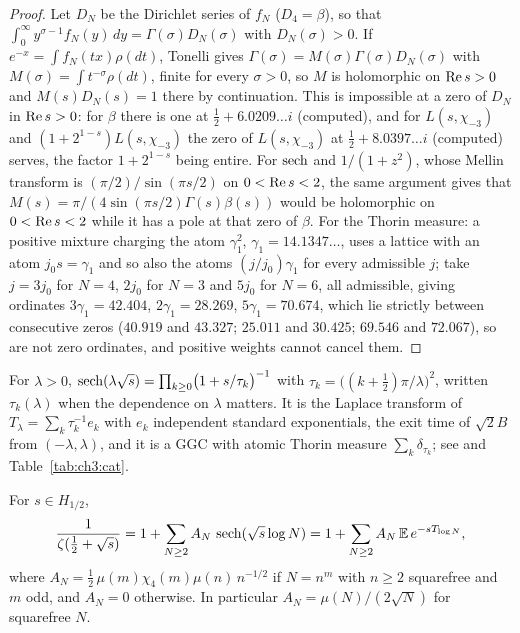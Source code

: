 \begin{proof}
Let $D_N$ be the Dirichlet series of $f_N$ ($D_4=\beta$), so that $\int_0^\infty y^{\sigma-1}f_N(y)\,dy=\Gamma(\sigma)D_N(\sigma)$ with $D_N(\sigma)>0$. If $e^{-x}=\int f_N(tx)\rho(dt)$, Tonelli gives $\Gamma(\sigma)=M(\sigma)\Gamma(\sigma)D_N(\sigma)$ with $M(\sigma)=\int t^{-\sigma}\rho(dt)$, finite for every $\sigma>0$, so $M$ is holomorphic on $\operatorname{Re} s>0$ and $M(s)D_N(s)=1$ there by continuation. This is impossible at a zero of $D_N$ in $\operatorname{Re} s>0$: for $\beta$ there is one at $\frac12+6.0209\ldots i$ (computed), and for $L(s,\chi_{-3})$ and $(1+2^{1-s})L(s,\chi_{-3})$ the zero of $L(s,\chi_{-3})$ at $\frac12+8.0397\ldots i$ (computed) serves, the factor $1+2^{1-s}$ being entire. For $\operatorname{sech}$ and $1/(1+z^2)$, whose Mellin transform is $(\pi/2)/\sin(\pi s/2)$ on $0<\operatorname{Re} s<2$, the same argument gives that $M(s)=\pi/(4\sin(\pi s/2)\Gamma(s)\beta(s))$ would be holomorphic on $0<\operatorname{Re} s<2$ while it has a pole at that zero of $\beta$. For the Thorin measure: a positive mixture charging the atom $\gamma_1^2$, $\gamma_1=14.1347\ldots$, uses a lattice with an atom $j_0s=\gamma_1$ and so also the atoms $(j/j_0)\gamma_1$ for every admissible $j$; take $j=3j_0$ for $N=4$, $2j_0$ for $N=3$ and $5j_0$ for $N=6$, all admissible, giving ordinates $3\gamma_1=42.404$, $2\gamma_1=28.269$, $5\gamma_1=70.674$, which lie strictly between consecutive zeros ($40.919$ and $43.327$; $25.011$ and $30.425$; $69.546$ and $72.067$), so are not zero ordinates, and positive weights cannot cancel them.
\end{proof}

\begin{lemma}\label{rz:lem:sech}
For $\lambda>0$, $\operatorname{sech}(\lambda\sqrt{s})=\prod_{k\ge0}\bigl(1+s/\tau_k\bigr)^{-1}$ with $\tau_k=\bigl((k+\frac12)\pi/\lambda\bigr)^2$, written $\tau_k(\lambda)$ when the dependence on $\lambda$ matters. It is the Laplace transform of $T_\lambda=\sum_k\tau_k^{-1}e_k$ with $e_k$ independent standard exponentials, the exit time of $\sqrt2B$ from $(-\lambda,\lambda)$, and it is a GGC with atomic Thorin measure $\sum_k\delta_{\tau_k}$; see \cite{BPY01} and Table~\ref{tab:ch3:cat}.
\end{lemma}

\begin{theorem}\label{rz:thm:sech}
For $s\in H_{1/2}$,
\[
\frac{1}{\zeta(\frac12+\sqrt{s})}=1+\sum_{N\ge2}A_N\,\operatorname{sech}(\sqrt{s}\log N)=1+\sum_{N\ge2}A_N\,\mathbb{E}\,e^{-sT_{\log N}},
\]
where $A_N=\frac12\,\mu(m)\chi_4(m)\mu(n)\,n^{-1/2}$ if $N=n^m$ with $n\ge2$ squarefree and $m$ odd, and $A_N=0$ otherwise. In particular $A_N=\mu(N)/(2\sqrt N)$ for squarefree $N$.
\end{theorem}

